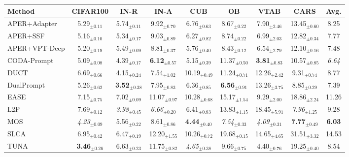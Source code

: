 \renewcommand{\arraystretch}{0.95}
\begin{adjustbox}{max width=\textwidth}
\footnotesize
\begin{tabular}{l c c c c c c c c}
\toprule
Method & \textbf{CIFAR100} & \textbf{IN-R} & \textbf{IN-A} & \textbf{CUB} & \textbf{OB} & \textbf{VTAB} & \textbf{CARS} & \textbf{Avg.} \\
\midrule
APER+Adapter & 5.29$_{\pm 0.11}$ & 5.74$_{\pm 0.11}$ & 9.92$_{\pm 0.70}$ & 6.76$_{\pm 0.63}$ & 8.67$_{\pm 0.22}$ & 7.90$_{\pm 2.46}$ & 13.45$_{\pm 0.60}$ & 8.25 \\
APER+SSF & 5.16$_{\pm 0.10}$ & 5.34$_{\pm 0.17}$ & 9.03$_{\pm 0.89}$ & 6.27$_{\pm 0.82}$ & 8.74$_{\pm 0.22}$ & 6.99$_{\pm 2.03}$ & 12.82$_{\pm 0.34}$ & 7.77 \\
APER+VPT-Deep & 5.20$_{\pm 0.19}$ & 5.49$_{\pm 0.09}$ & 8.81$_{\pm 0.37}$ & 5.76$_{\pm 0.40}$ & 8.43$_{\pm 0.12}$ & 6.54$_{\pm 2.79}$ & 12.10$_{\pm 0.16}$ & 7.48 \\
CODA-Prompt & 5.09$_{\pm 0.08}$ & 4.39$_{\pm 0.17}$ & \textbf{6.12}$_{\pm 0.57}$ & 5.15$_{\pm 0.39}$ & 11.37$_{\pm 0.50}$ & \textbf{3.81}$_{\pm 0.83}$ & 10.57$_{\pm 0.85}$ & \textit{6.64} \\
DUCT & 6.69$_{\pm 0.66}$ & 4.15$_{\pm 0.24}$ & 7.54$_{\pm 1.02}$ & 10.19$_{\pm 0.49}$ & 11.24$_{\pm 0.71}$ & 12.26$_{\pm 2.42}$ & 9.31$_{\pm 0.74}$ & 8.77 \\
DualPrompt & 5.26$_{\pm 0.62}$ & \textbf{3.52}$_{\pm 0.38}$ & 7.95$_{\pm 0.83}$ & 6.36$_{\pm 0.85}$ & \textbf{6.56}$_{\pm 0.91}$ & 13.26$_{\pm 3.75}$ & 8.85$_{\pm 0.29}$ & 7.39 \\
EASE & 7.15$_{\pm 0.75}$ & 7.02$_{\pm 0.09}$ & 11.07$_{\pm 0.97}$ & 10.28$_{\pm 0.68}$ & 15.17$_{\pm 1.54}$ & 9.29$_{\pm 2.00}$ & 18.86$_{\pm 2.24}$ & 11.26 \\
L2P & 7.69$_{\pm 0.12}$ & \textit{3.98}$_{\pm 0.45}$ & \textit{6.66}$_{\pm 0.20}$ & 6.41$_{\pm 0.83}$ & 13.83$_{\pm 1.15}$ & 18.45$_{\pm 5.91}$ & \textit{7.96}$_{\pm 1.25}$ & 9.28 \\
MOS & \textit{4.23}$_{\pm 0.09}$ & 5.56$_{\pm 0.22}$ & 8.61$_{\pm 0.86}$ & \textbf{4.44}$_{\pm 0.40}$ & \textit{7.54}$_{\pm 0.33}$ & \textit{4.09}$_{\pm 0.31}$ & \textbf{7.77}$_{\pm 0.49}$ & \textbf{6.03} \\
SLCA & 6.95$_{\pm 0.42}$ & 6.47$_{\pm 0.19}$ & 12.20$_{\pm 1.55}$ & 10.26$_{\pm 0.72}$ & 19.68$_{\pm 0.15}$ & 14.65$_{\pm 4.65}$ & 31.51$_{\pm 3.32}$ & 14.53 \\
TUNA & \textbf{3.46}$_{\pm 0.26}$ & 6.63$_{\pm 0.23}$ & 11.75$_{\pm 0.82}$ & \textit{4.65}$_{\pm 0.38}$ & 9.66$_{\pm 0.75}$ & 4.40$_{\pm 0.76}$ & 19.25$_{\pm 0.40}$ & 8.54 \\

\end{tabular}
\end{adjustbox}
